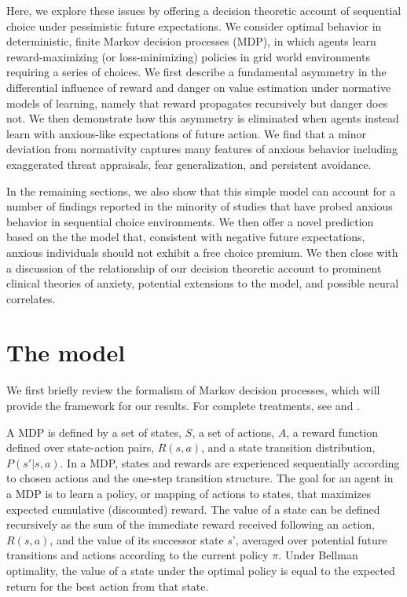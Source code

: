 \documentclass[11pt]{article} %
\begin{document}
Here, we explore these issues by offering a decision theoretic account of sequential choice under pessimistic future expectations. We consider optimal behavior in deterministic, finite Markov decision processes (MDP), in which agents learn reward-maximizing (or loss-minimizing) policies in grid world environments requiring a series of choices. We first describe a fundamental asymmetry in the differential influence of reward and danger on value estimation under normative models of learning, namely that reward propagates recursively but danger does not. We then demonstrate how this asymmetry is eliminated when agents instead learn with anxious-like expectations of future action. We find that a minor deviation from normativity captures many features of anxious behavior including exaggerated threat appraisals, fear generalization, and persistent avoidance.

In the remaining sections, we also show that this simple model can account for a number of findings reported in the minority of studies that have probed anxious behavior in sequential choice environments. We then offer a novel prediction based on the the model that, consistent with negative future expectations, anxious individuals should not exhibit a free choice premium. We then close with a discussion of the relationship of our decision theoretic account to prominent clinical theories of anxiety, potential extensions to the model, and possible neural correlates.

\section{The model}

We first briefly review the formalism of Markov decision processes, which will provide the framework for our results. For complete treatments, see \cite{SuttonBarto1998, SuttonBarto2018} and \cite{bertsekas2005}.

A MDP is defined by a set of states, $S$, a set of actions, $A$, a reward function defined over state-action pairs, $R(s,a)$, and a state transition distribution, $P(s'|s,a)$. In a MDP, states and rewards are experienced sequentially according to chosen actions and the one-step transition structure. The goal for an agent in a MDP is to learn a policy, or mapping of actions to states, that maximizes expected cumulative (discounted) reward. The value of a state can be defined recursively as the sum of the immediate reward received following an action, $R(s, a)$, and the value of its successor state $s’$, averaged over potential future transitions and actions according to the current policy $\pi$. Under Bellman optimality, the value of a state under the optimal policy is equal to the expected return for the best action from that state.
\end{document}
